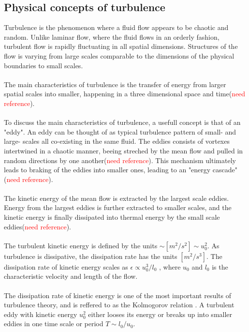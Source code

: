 \documentclass[a4paper, 12pt]{report}
\begin{document}
\subsection{Physical concepts of turbulence}
Turbulence is the phenomenon where a fluid flow appears to be chaotic and random. Unlike laminar flow, where the fluid flows in an orderly fashion, turbulent flow is rapidly fluctuating in all spatial dimensions. Structures of the flow is varying from large scales comparable to the dimensions of the physical boundaries to small scales.\\
\\
The main characteristics of turbulence is the transfer of energy from larger spatial scales into smaller, happening in a three dimensional space and time(\textcolor{red}{need reference}).\\
\\
 To discuss the main characteristics of turbulence, a usefull concept is that of an "eddy". An eddy can be thought of as typical turbulence pattern of small- and large- scales all co-existing in the same fluid. The eddies consists of vortexes intertwined in a chaotic manner, beeing streched by the mean flow and pulled in random directions by one another(\textcolor{red}{need reference}). This mechanism ultimately leads to braking of the eddies into smaller ones, leading to an "energy cascade"(\textcolor{red}{need reference}).\\
\\
The kinetic energy of the mean flow is extracted by the largest scale eddies. Energy from the largest eddies is further extracted to smaller scales, and the kinetic energy is finally dissipated into thermal energy by the small scale eddies(\textcolor{red}{need reference}).\\
\\
The turbulent kinetic energy is defined by the units $\sim [m^2/s^2] \sim u_0^2$. As turbulence is dissipative, the dissipation rate has the units $[m^2/s^3]$. The dissipation rate of kinetic energy scales as $\epsilon \propto u_0^3/l_0$ \cite{Turbulence}, where $u_0$ and $l_0$ is the characteristic velocity and length of the flow.\\
\\
The dissipation rate of kinetic energy is one of the most important results of turbulence theory, and is reffered to as the Kolmogorov relation \cite{Turbulence}. A turbulent eddy with kinetic energy $u_0^2$ either looses its energy or breaks up into smaller eddies in one time scale or period $T \sim l_0/u_0$.\\
\\
\end{document}
